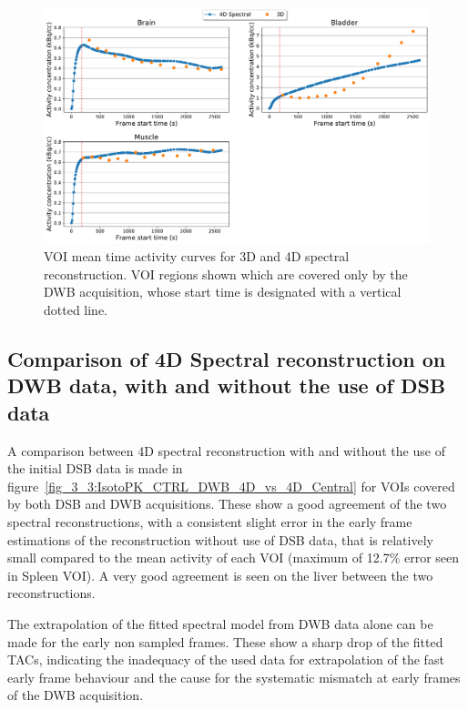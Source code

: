 \begin{figure} [h!]
\centering
\includegraphics[scale=0.5,angle=0]{3_Results/3_3_DWB_Reconstruction/figures/3_3_IsotoPK_CTRL_DWB_3D_vs_4D_peripheral.pdf}
\caption{VOI mean time activity curves for 3D and 4D spectral reconstruction. VOI regions shown which are covered only by the DWB acquisition, whose start time is designated with a vertical dotted line.}
\label{fig_3_3:IsotoPK_CTRL_DWB_4D_vs_3D_Peripheral}
\end{figure} 

\subsection{Comparison of 4D Spectral reconstruction on DWB data, with and without the use of DSB data}
A comparison between 4D spectral reconstruction with and without the use of the initial DSB data is made in figure~\ref{fig_3_3:IsotoPK_CTRL_DWB_4D_vs_4D_Central} for VOIs covered by both DSB and DWB acquisitions. These show a good agreement of the two spectral reconstructions, with a consistent slight error in the early frame estimations of the reconstruction without use of DSB data, that is relatively small compared to the mean activity of each VOI (maximum of 12.7\% error seen in Spleen VOI). A very good agreement is seen on the liver between the two reconstructions.

The extrapolation of the fitted spectral model from DWB data alone can be made for the early non sampled frames. These show a sharp drop of the fitted TACs, indicating the inadequacy of the used data for extrapolation of the fast early frame behaviour and the cause for the systematic mismatch at early frames of the DWB acquisition.

